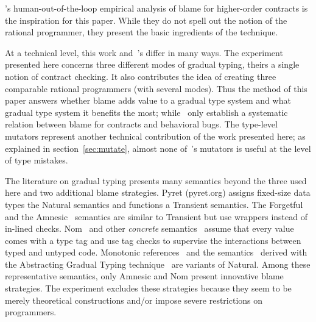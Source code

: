 
\citet{lksfd-popl-2020}'s human-out-of-the-loop empirical analysis of blame for
higher-order contracts is the inspiration for this paper.  While they do not
spell out the notion of the rational programmer, they present the basic
ingredients of the technique.

At a technical level, this work and~\citet{lksfd-popl-2020}'s differ in
many ways. The experiment presented here concerns three different modes of
gradual typing, theirs a single notion of contract checking.  It also
contributes the idea of creating three comparable rational programmers
(with several modes). Thus the method of this paper answers whether blame
adds value to a gradual type system and what gradual type system it
benefits the most; while~\citet{lksfd-popl-2020} only establish a
systematic relation between blame for contracts and behavioral bugs. The
type-level mutators represent another technical contribution of the work
presented here; as explained in section~\ref{sec:mutate}, almost none
of~\citet{lksfd-popl-2020}'s mutators is useful at the level of type
mistakes.

The literature on gradual typing presents many semantics beyond the three used
here and two additional blame strategies.  Pyret (pyret.org) assigns fixed-size
data types the Natural semantics and functions a Transient semantics. The
Forgetful~\cite{cl-icfp-2017} and the Amnesic~\cite{gfd-oopsla-2019} semantics
are similar to Transient but use wrappers instead of in-lined checks.
Nom~\cite{mt-oopsla-2017} and other \emph{concrete\/}
semantics~\cite{wnlov-popl-2010, rsfbv-popl-2015, rzv-ecoop-2015,
rat-oopsla-2017} assume that every value comes with a type tag and use tag
checks to supervise the interactions between typed and untyped code.  Monotonic
references~\cite{svctg-esop-2015} and the semantics~\cite{tlt-popl-2019,
etg-icfp-19, tt-scp-20, tgt-popl-18, tt-sas-17} derived with the Abstracting
Gradual Typing technique~\cite{gct-popl-2016} are variants of Natural.  Among
these representative semantics, only Amnesic and Nom present innovative blame
strategies.  The experiment excludes these strategies because they seem to be
merely theoretical constructions and/or impose severe restrictions on
programmers.
 
